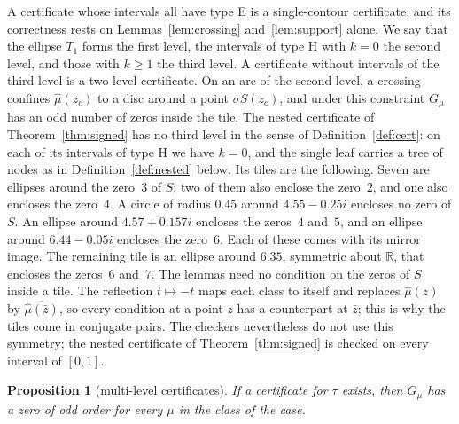 \documentclass[11pt]{amsart}
\newtheorem{proposition}[theorem]{Proposition}
\theoremstyle{definition}
\theoremstyle{remark}
\numberwithin{equation}{section}
\newcommand{\R}{\mathbb{R}}
\newcommand{\QSymTail}{; the nested certificate of Theorem~\ref{thm:signed} is checked on every interval of $[0,1]$}
\begin{document}
A certificate whose intervals all have type E is a single-contour certificate, and its correctness rests on Lemmas~\ref{lem:crossing} and~\ref{lem:support} alone. We say that the ellipse $T_1$ forms the first level, the intervals of type H with $k=0$ the second level, and those with $k\ge1$ the third level. A certificate without intervals of the third level is a two-level certificate. On an arc of the second level, a crossing confines $\hat\mu(z_c)$ to a disc around a point $\sigma S(z_c)$, and under this constraint $G_\mu$ has an odd number of zeros inside the tile. The nested certificate of Theorem~\ref{thm:signed} has no third level in the sense of Definition~\ref{def:cert}: on each of its intervals of type H we have $k=0$, and the single leaf carries a tree of nodes as in Definition~\ref{def:nested} below. Its tiles are the following. Seven are ellipses around the zero~$3$ of $S$; two of them also enclose the zero~$2$, and one also encloses the zero~$4$. A circle of radius $0.45$ around $4.55-0.25i$ encloses no zero of $S$. An ellipse around $4.57+0.157i$ encloses the zeros~$4$ and~$5$, and an ellipse around $6.44-0.05i$ encloses the zero~$6$. Each of these comes with its mirror image. The remaining tile is an ellipse around $6.35$, symmetric about $\R$, that encloses the zeros~$6$ and~$7$.
The lemmas need no condition on the zeros of $S$ inside a tile. The reflection $t\mapsto-t$ maps each class to itself and replaces $\hat\mu(z)$ by $\overline{\hat\mu(\bar z)}$, so every condition at a point $z$ has a counterpart at $\bar z$; this is why the tiles come in conjugate pairs. The checkers nevertheless do not use this symmetry\QSymTail.

\begin{proposition}[multi-level certificates]\label{prop:multilevel}
If a certificate for $\tau$ exists, then $G_\mu$ has a zero of odd order for every $\mu$ in the class of the case.
\end{proposition}
\end{document}
